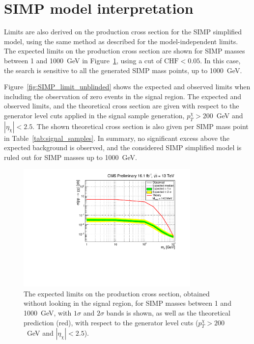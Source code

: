 \section{SIMP model interpretation}
\label{sec:SIMP_interpretation}

Limits are also derived on the production cross section for the \ac{SIMP} simplified model, using the same method as described for the model-independent limits.  The expected limits on the production cross section are shown for \ac{SIMP} masses between 1 and 1000~GeV in Figure~\ref{fig:SIMP_limit}, using a cut of $\mathrm{CHF} < 0.05$. In this case, the search is sensitive to all the generated \ac{SIMP} mass points, up to 1000~GeV.

Figure~\ref{fig:SIMP_limit_unblinded} shows the expected and observed limits when including the observation of zero events in the signal region. The expected and observed limits, and the theoretical cross section are given with respect to the generator level cuts applied in the signal sample generation, $p_T^{\chi} > 200$~GeV and $|\eta_{\chi}| < 2.5$. The shown theoretical cross section is also given per \ac{SIMP} mass point in Table~\ref{tab:signal_samples}. In summary, no significant excess above the expected background is observed, and the considered \ac{SIMP} simplified model is ruled out for \ac{SIMP} masses up to 1000~GeV.

\begin{figure}[ht]
  \centering
  \includegraphics[width=0.8\textwidth]{figures/SIMP_limit_ChF0p05.pdf}\hfill%
  \caption{The expected limits on the production cross section, obtained without looking in the signal region, for \ac{SIMP} masses between 1 and 1000~GeV, with $1\sigma$ and $2\sigma$ bands is shown, as well as the theoretical prediction (red), with respect to the generator level cuts ($p_T^{\chi} > 200$~GeV and $|\eta_{\chi}| < 2.5$).}
  \label{fig:SIMP_limit}
\end{figure}

